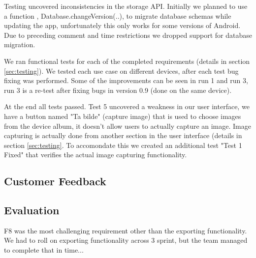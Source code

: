 Testing uncovered inconsistencies in the storage API. Initially we planned to
use a function , Database.changeVersion(..), to migrate database schemas while
updating the app, unfortunately this only works for some versions of Android.
Due to preceding comment and time restrictions we dropped support for database
migration.

We ran functional tests for each of the completed requirements (details in
section \ref{sec:testing}). We tested each use case on different devices, after
each test bug fixing was performed. Some of the improvements can be seen in run
1 and run 3, run 3 is a re-test after fixing bugs in version 0.9 (done on the
same device). 

At the end all tests passed. Test 5 uncovered a weakness in our user interface,
we have a button named "Ta bilde" (capture image) that is used to choose images
from the device album, it doesn't allow users to actually capture an image.
Image capturing is actually done from another section in the user interface
(details in section \ref{sec:testing}. To accomondate this we created an
additional test "Test 1 Fixed" that verifies the actual image capturing
functionality.

\subsection{Customer Feedback}

\subsection{Evaluation}

F8 was the most challenging requirement other than the exporting functionality.
We had to roll on exporting functionality across 3 sprint, but the team managed
to complete that in time...
